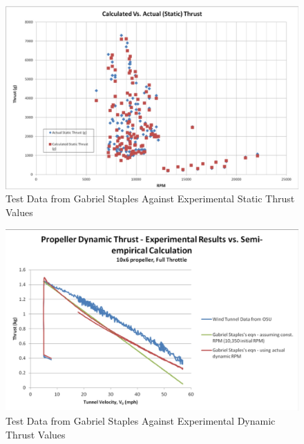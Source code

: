 \documentclass[../main.tex]{subfiles}
\begin{document}
\begin{figure}[H]
	\centering
	\includegraphics[width=1\textwidth]{img/thrust/thruststatictest.jpg}
	\caption{Test Data from Gabriel Staples Against Experimental Static Thrust Values \cite{thrusteq}}
	\label{fig:thruststatictest}
\end{figure}

\begin{figure}[H]
	\centering
	\includegraphics[width=1\textwidth]{img/thrust/thrustdynamictest.jpg}
	\caption{Test Data from Gabriel Staples Against Experimental Dynamic Thrust Values \cite{thrusteq}}
	\label{fig:thrustdynamictest}
\end{figure}
\end{document}
